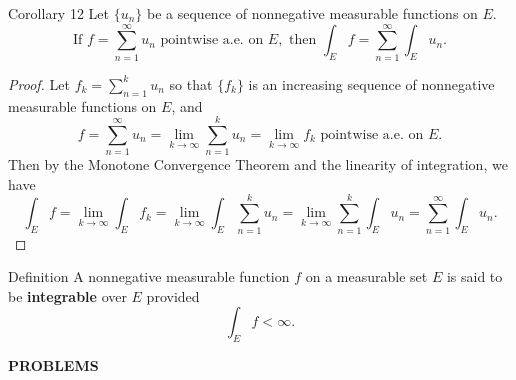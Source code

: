 \begin{flushleft}
    \begin{namedthm*}{Corollary 12}
        Let $\{u_n\}$ be a sequence of nonnegative measurable functions on $E$.
        \[
            \text{If }f=\sum_{n=1}^\infty u_n\text{ pointwise a.e. on }E,\text{ then }\int_Ef=\sum_{n=1}^\infty\int_Eu_n.
        \]
    \end{namedthm*}
    \begin{proof}
        Let $f_k=\sum_{n=1}^ku_n$ so that $\{f_k\}$ is an increasing sequence of nonnegative measurable functions on $E$, and
        \[
            f=\sum_{n=1}^\infty u_n=\lim_{k\to\infty}\sum_{n=1}^ku_n=\lim_{k\to\infty}f_k\text{ pointwise a.e. on }E.
        \]
        Then by the Monotone Convergence Theorem and the linearity of integration, we have
        \[
            \int_Ef=\lim_{k\to\infty}\int_Ef_k=\lim_{k\to\infty}\int_E\sum_{n=1}^ku_n=\lim_{k\to\infty}\sum_{n=1}^k\int_Eu_n=\sum_{n=1}^\infty\int_Eu_n.
        \]
    \end{proof}
    \begin{namedthm*}{Definition}
        A nonnegative measurable function $f$ on a measurable set $E$ is said to be \textbf{integrable} over $E$ provided
        \[
            \int_Ef<\infty.    
        \]
    \end{namedthm*}
\end{flushleft}
\begin{center}
	\textbf{PROBLEMS}
\end{center}
